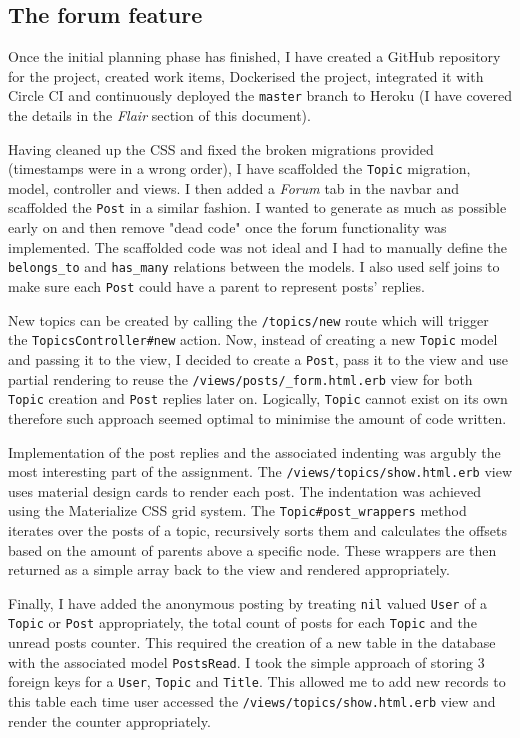\documentclass[a4paper, 11pt, titlepage]{article}
\begin{document}
\subsection{The forum feature}
Once the initial planning phase has finished, I have created a GitHub repository for the project,
created work items, Dockerised the project, integrated it with Circle CI and continuously deployed the \texttt{master}
branch to Heroku (I have covered the details in the \textit{Flair} section of this document).

Having cleaned up the CSS and fixed the broken migrations provided (timestamps were in a wrong order),
I have scaffolded the \texttt{Topic} migration, model, controller and views. I then added a
\textit{Forum} tab in the navbar and scaffolded the \texttt{Post} in a similar fashion. I wanted
to generate as much as possible early on and then remove "dead code" once the forum functionality
was implemented. The scaffolded code was not ideal and I had to manually define the \texttt{belongs\_to}
and \texttt{has\_many} relations between the models. I also used self joins to make sure each \texttt{Post}
could have a parent to represent posts' replies.

New topics can be created by calling the \texttt{/topics/new} route which will trigger the \texttt{TopicsController\#new}
action. Now, instead of creating a new \texttt{Topic} model and passing it to the view, I decided to create
a \texttt{Post}, pass it to the view and use partial rendering to reuse the \texttt{/views/posts/\_form.html.erb}
view for both \texttt{Topic} creation and \texttt{Post} replies later on. Logically, \texttt{Topic} cannot exist on its own
therefore such approach seemed optimal to minimise the amount of code written.

Implementation of the post replies and the associated indenting was argubly the most interesting
part of the assignment. The \texttt{/views/topics/show.html.erb} view uses material design cards to
render each post. The indentation was achieved using the Materialize CSS\cite{1} grid system.
The \texttt{Topic\#post\_wrappers} method iterates over the posts of a topic, recursively sorts
them and calculates the offsets based on the amount of parents above a specific node. These wrappers
are then returned as a simple array back to the view and rendered appropriately.

Finally, I have added the anonymous posting by treating \texttt{nil} valued \texttt{User} of a \texttt{Topic} or \texttt{Post}
appropriately, the total count of posts for each \texttt{Topic} and the unread posts counter. This required the creation of a new
table in the database with the associated model \texttt{PostsRead}. I took the simple approach of storing 3 foreign keys
for a \texttt{User}, \texttt{Topic} and \texttt{Title}. This allowed me to add new records to this table each time user
accessed the \texttt{/views/topics/show.html.erb} view and render the counter appropriately.
\end{document}
